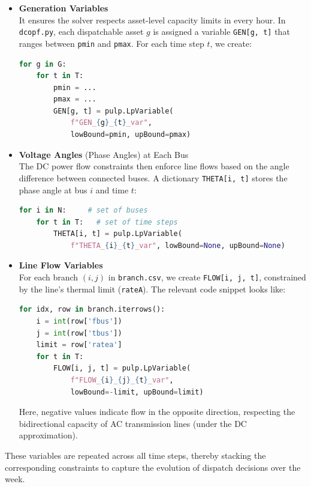 \begin{itemize}
  \item \textbf{Generation Variables}\\
  It ensures the solver respects asset-level capacity limits in every hour.
  In \texttt{dcopf.py}, each dispatchable asset $g$ is assigned a variable
  \lstinline|GEN[g, t]| that ranges between \lstinline|pmin| and \lstinline|pmax|.
  For each time step $t$, we create:
  \begin{lstlisting}[language=python]
  for g in G:
    for t in T:
        pmin = ...
        pmax = ...
        GEN[g, t] = pulp.LpVariable(
            f"GEN_{g}_{t}_var",
            lowBound=pmin, upBound=pmax)
  \end{lstlisting}

  \item \textbf{Voltage Angles} (Phase Angles) at Each Bus \\
  The DC power flow constraints then enforce line flows based on the angle difference between connected buses.
  A dictionary \lstinline|THETA[i, t]| stores the phase angle at bus $i$ and time $t$:
  \begin{lstlisting}[language=python]
  for i in N:     # set of buses
    for t in T:   # set of time steps
        THETA[i, t] = pulp.LpVariable(
            f"THETA_{i}_{t}_var", lowBound=None, upBound=None)
    \end{lstlisting}
    
  \item \textbf{Line Flow Variables} \\
  For each branch $(i, j)$ in \texttt{branch.csv}, we create \lstinline|FLOW[i, j, t]|,
  constrained by the line's thermal limit (\lstinline|rateA|). The relevant code snippet
  looks like:
  \begin{lstlisting}[language=python]
  for idx, row in branch.iterrows():
    i = int(row['fbus'])
    j = int(row['tbus'])
    limit = row['ratea']
    for t in T:
        FLOW[i, j, t] = pulp.LpVariable(
            f"FLOW_{i}_{j}_{t}_var",
            lowBound=-limit, upBound=limit)
    \end{lstlisting}
    Here, negative values indicate flow in the opposite direction, respecting the
    bidirectional capacity of AC transmission lines (under the DC approximation).
\end{itemize}

These variables are repeated across all time steps, thereby stacking the corresponding constraints to capture the
evolution of dispatch decisions over the week.

